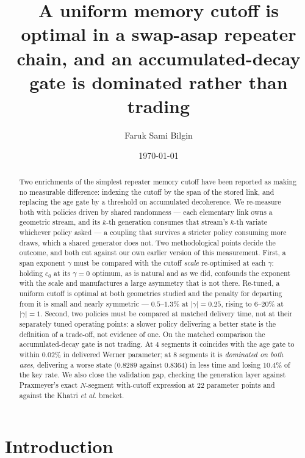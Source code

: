 \documentclass[aps,pra,twocolumn,superscriptaddress,floatfix,nofootinbib]{revtex4-2}
\begin{document}
\title{A uniform memory cutoff is optimal in a swap-asap repeater chain, and an
       accumulated-decay gate is dominated rather than trading}

\author{Faruk Sami Bilgin}

\date{\today}

\begin{abstract}
Two enrichments of the simplest repeater memory cutoff have been reported as
making no measurable difference: indexing the cutoff by the span of the stored
link, and replacing the age gate by a threshold on accumulated decoherence. We
re-measure both with policies driven by shared randomness --- each elementary
link owns a geometric stream, and its $k$-th generation consumes that stream's
$k$-th variate whichever policy asked --- a coupling that survives a stricter
policy consuming more draws, which a shared generator does not. Two
methodological points decide the outcome, and both cut against our own earlier
version of this measurement. First, a span exponent $\gamma$ must be compared
with the cutoff \emph{scale} re-optimised at each $\gamma$: holding $c_0$ at its
$\gamma=0$ optimum, as is natural and as we did, confounds the exponent with the
scale and manufactures a large asymmetry that is not there. Re-tuned, a uniform
cutoff is optimal at both geometries studied and the penalty for departing from
it is small and nearly symmetric --- $0.5$--$1.3\%$ at $|\gamma|=0.25$, rising
to $6$--$20\%$ at $|\gamma|=1$. Second, two policies must be compared at matched
delivery time, not at their separately tuned operating points: a slower policy
delivering a better state is the definition of a trade-off, not evidence of one.
On the matched comparison the accumulated-decay gate is not trading. At $4$
segments it coincides with the age gate to within $0.02\%$ in delivered Werner
parameter; at $8$ segments it is \emph{dominated on both axes}, delivering a
worse state ($0.8289$ against $0.8364$) in less time and losing $10.4\%$ of the
key rate. We also close the validation gap, checking the generation layer
against Praxmeyer's exact $N$-segment with-cutoff expression at $22$ parameter
points and against the Khatri \emph{et al.} bracket.
\end{abstract}

\maketitle

\section{Introduction}
\end{document}
